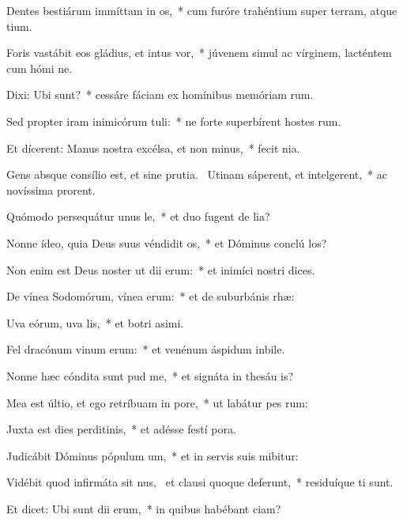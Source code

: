 \item Dentes bestiárum immíttam in os,~* cum furóre trahéntium super terram, atque tium.
\item Foris vastábit eos gládius, et intus vor,~* júvenem simul ac vírginem, lacténtem cum hómi ne.
\item Dixi: Ubi sunt?~* cessáre fáciam ex homínibus memóriam rum.
\item Sed propter iram inimicórum tuli:~* ne forte superbírent hostes rum.
\item Et dícerent: Manus nostra excélsa, et non minus,~* fecit  nia.
\item Gens absque consílio est, et sine prutia.~\pscross{} Utinam sáperent, et intelgerent,~* ac novíssima prorent.
\item Quómodo persequátur unus le,~* et duo fugent de lia?
\item Nonne ídeo, quia Deus suus véndidit os,~* et Dóminus conclú los?
\item Non enim est Deus noster ut dii erum:~* et inimíci nostri  dices.
\item De vínea Sodomórum, vínea erum:~* et de suburbánis rhæ:
\item Uva eórum, uva lis,~* et botri asimi.
\item Fel dracónum vinum erum:~* et venénum áspidum inbile.
\item Nonne hæc cóndita sunt pud me,~* et signáta in thesáu is?
\item Mea est últio, et ego retríbuam in pore,~* ut labátur pes rum:
\item Juxta est dies perditinis,~* et adésse festí pora.
\item Judicábit Dóminus pópulum um,~* et in servis suis mibitur:
\item Vidébit quod infirmáta sit nus,~\pscross{} et clausi quoque deferunt,~* residuíque ti sunt.
\item Et dicet: Ubi sunt dii erum,~* in quibus habébant ciam?
